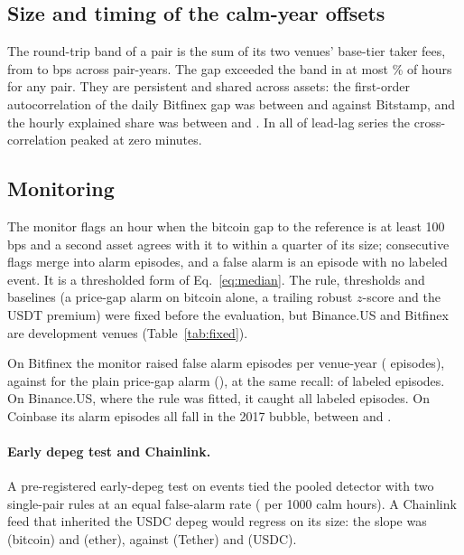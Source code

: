 \documentclass[sigconf,review,anonymous]{acmart}
\begin{document}
\subsection{Size and timing of the calm-year offsets}
\label{app:secondary}
The round-trip band of
a pair is the sum of its two venues' base-tier taker fees, from \NumNBandMin{} to \NumNBandMax{} bps across pair-years. The
gap exceeded the band in at most \NumNCalmAboveBandMaxPct\% of hours for any pair. They are persistent and shared across assets: the first-order autocorrelation of the daily Bitfinex gap was between
\NumNBfxBstAcOneMin{} and \NumNBfxBstAcOneMax{} against Bitstamp, and the hourly explained share was between
\NumNBfxBstExplMedMin{} and \NumNBfxBstExplMedMax{}. In all \NumNLagZeroCount{} of \NumNLagTotal{} lead-lag series the
cross-correlation peaked at zero minutes.

\subsection{Monitoring}
The monitor flags an hour when the bitcoin gap to the reference is at least 100 bps and a second asset agrees with it to within a quarter of its size; consecutive flags merge into alarm episodes, and a false alarm is an episode with no labeled event. It is a thresholded form of
Eq.~\eqref{eq:median}. The rule, thresholds and baselines (a price-gap alarm on bitcoin alone, a trailing robust $z$-score and the USDT premium) were fixed before the evaluation, but Binance.US and Bitfinex are development venues
(Table~\ref{tab:fixed}).

On Bitfinex the monitor raised \NumUDetFaBfxTwo{} false alarm episodes per venue-year (\NumUDetFaBfxCount{} episodes),
against \NumUBaseFaBfxTwo{} for the plain price-gap alarm (\NumUBaseFaBfxCount{}), at the same recall:
\NumUDetCaught{} of \NumUDetCovered{} labeled episodes. On Binance.US, where the rule was fitted, it caught all
labeled episodes. On Coinbase its \NumUCbEpisodes{} alarm episodes all fall in the 2017 bubble, between \NumUCbFirstAlarm{}
and \NumUCbLastAlarm{}\label{app:windows}.

\paragraph{Early depeg test and Chainlink.} A pre-registered early-depeg test on \NumQTNScored{} events tied the pooled detector with two single-pair rules at an equal
false-alarm rate (\NumQTFalseAlarmRateP{} per 1000 calm hours). A Chainlink feed that inherited the USDC depeg would regress on its size: the slope was \NumUOracleSlopeBtc{} (bitcoin) and \NumUOracleSlopeEth{} (ether), against
\NumUOracleSlopeUsdt{} (Tether) and \NumUOracleSlopeUsdc{} (USDC).
\end{document}
